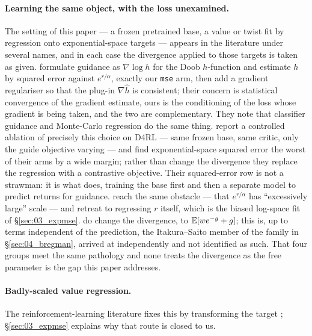 \paragraph{Learning the same object, with the loss unexamined.}
The setting of this paper --- a frozen pretrained base, a value or twist fit by
regression onto exponential-space targets --- appears in the literature under
several names, and in each case the divergence applied to those targets is
taken as given. \citet{chang2026vsdm} formulate guidance as
$\nabla\log h$ for the Doob $h$-function and estimate $h$ by squared error
against $e^{r/\alpha}$, exactly our \texttt{mse} arm, then add a gradient
regulariser so that the plug-in $\nabla\widehat h$ is consistent; their concern
is statistical convergence of the gradient estimate, ours is the conditioning
of the loss whose gradient is being taken, and the two are complementary. They
note that classifier guidance and Monte-Carlo regression do the same thing.
\citet{lu2023qgpo} report a controlled ablation of precisely this choice on
D4RL --- same frozen base, same critic, only the guide objective varying ---
and find exponential-space squared error the worst of their arms by a wide
margin; rather than change the divergence they replace the regression with a
contrastive objective. Their squared-error row is not a strawman: it is what
\citet{janner2022diffuser} does, training the base first and then a separate
model to predict returns for guidance. \citet{li2024svdd} reach the same obstacle --- that
$e^{r/\alpha}$ has ``excessively large'' scale --- and retreat to regressing
$r$ itself, which is the biased log-space fit of \S\ref{sec:03_expmse}.
\citet{mao2024diffusiondice} do change the divergence, to
$\mathbb{E}[w e^{-g}+g]$; this is, up to terms independent of the prediction, the
Itakura--Saito member of the family in \S\ref{sec:04_bregman}, arrived at
independently and not identified as such. That four groups meet the same
pathology and none treats the divergence as the free parameter is the gap this
paper addresses.

\paragraph{Badly-scaled value regression.}
The reinforcement-learning literature fixes this by transforming the target
\citep{vanhasselt2016popart,pohlen2018observe,farebrother2024stopregressing};
\S\ref{sec:03_expmse} explains why that route is closed to us.

